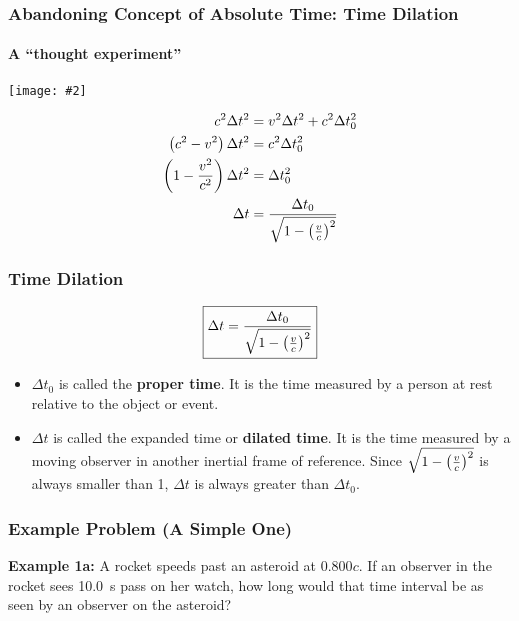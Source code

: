 \documentclass[12pt,compress,aspectratio=169]{beamer}
\newcommand{\pic}[2]{\texttt{[image: \#2]}}
\newcommand{\bigsqrt}{\ensuremath\sqrt{1-\left(\frac{v}{c}\right)^2}}
\begin{document}
\begin{frame}
  \frametitle{Abandoning Concept of Absolute Time: Time Dilation}
  \framesubtitle{A ``thought experiment''}
  \begin{center}
    \pic{.7}{dilation.png}
  \end{center}
  \begin{align*}
    c^2\Delta t^2 &=v^2\Delta t^2 + c^2\Delta t_0^2\\
    \left(c^2-v^2\right)\Delta t^2 &=c^2\Delta t_0^2\\
    \left(1-\frac{v^2}{c^2}\right)\Delta t^2 &=\Delta t_0^2\\
    \Delta t &=\frac{\Delta t_0}{\bigsqrt}
  \end{align*}
\end{frame}


\begin{frame}
  \frametitle{Time Dilation}
  {\Large
    \begin{displaymath}
      \boxed{\Delta t =\frac{\Delta t_0}{\bigsqrt}}
    \end{displaymath}
  }
  \begin{itemize}
  \item $\Delta t_0$ is called the \textbf{proper time}. It is the time measured
    by a person at rest relative to the object or event.
  \item $\Delta t$ is called the expanded time or \textbf{dilated time}. It is 
    the time measured by a moving observer in another inertial frame of
    reference. Since $\bigsqrt$ is always smaller than 1, $\Delta t$ is always
    greater than $\Delta t_0$.
  \end{itemize}
\end{frame}

\begin{frame}
  \frametitle{Example Problem (A Simple One)}
  \textbf{Example 1a:} A rocket speeds past an asteroid at 0.800$c$. If an
  observer in the rocket sees \SI{10.0}{s} pass on her watch, how long would
  that time interval be as seen by an observer on the asteroid?


\end{frame}
\end{document}
